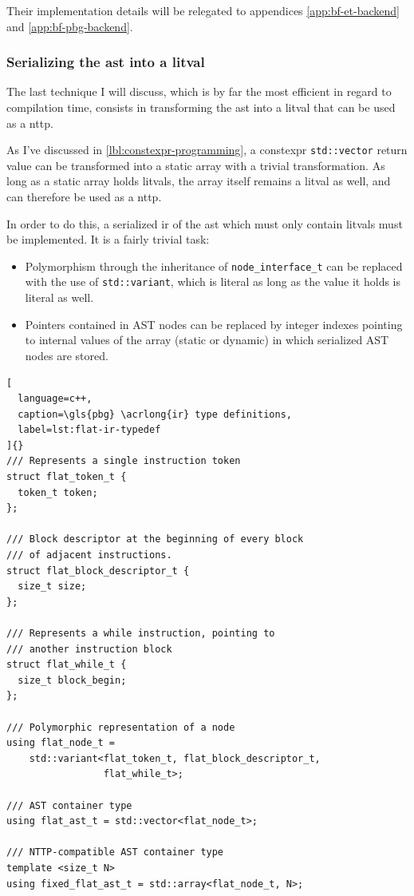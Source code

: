\documentclass[../main]{subfiles}
\begin{document}
Their implementation details will be relegated
to appendices \ref{app:bf-et-backend} and \ref{app:bf-pbg-backend}.


\subsubsection{Serializing the \gls{ast} into a \gls{litval}}

The last technique I will discuss, which is by far the most efficient
in regard to compilation time, consists in transforming the \gls{ast} into a
\gls{litval} that can be used as a \gls{nttp}.

As I've discussed in \ref{lbl:constexpr-programming}, a \gls{constexpr}
\lstinline{std::vector} return value can be transformed into a static array with
a trivial transformation. As long as a static array holds \glspl{litval},
the array itself remains a \gls{litval} as well, and can therefore be used
as a \gls{nttp}.

In order to do this, a serialized \gls{ir} of the \gls{ast}
which must only contain \glspl{litval} must be implemented.
It is a fairly trivial task:

\begin{itemize}
\item
Polymorphism through the inheritance of \lstinline{node_interface_t}
can be replaced with the use of \lstinline{std::variant}, which is literal
as long as the value it holds is literal as well.

\item
Pointers contained in AST nodes can be replaced by integer indexes pointing to
internal values of the array (static or dynamic) in which serialized
AST nodes are stored.
\end{itemize}

\begin{lstlisting}[
  language=c++,
  caption=\gls{pbg} \acrlong{ir} type definitions,
  label=lst:flat-ir-typedef
]{}
/// Represents a single instruction token
struct flat_token_t {
  token_t token;
};

/// Block descriptor at the beginning of every block
/// of adjacent instructions.
struct flat_block_descriptor_t {
  size_t size;
};

/// Represents a while instruction, pointing to
/// another instruction block
struct flat_while_t {
  size_t block_begin;
};

/// Polymorphic representation of a node
using flat_node_t =
    std::variant<flat_token_t, flat_block_descriptor_t,
                 flat_while_t>;

/// AST container type
using flat_ast_t = std::vector<flat_node_t>;

/// NTTP-compatible AST container type
template <size_t N>
using fixed_flat_ast_t = std::array<flat_node_t, N>;
\end{lstlisting}
\end{document}
